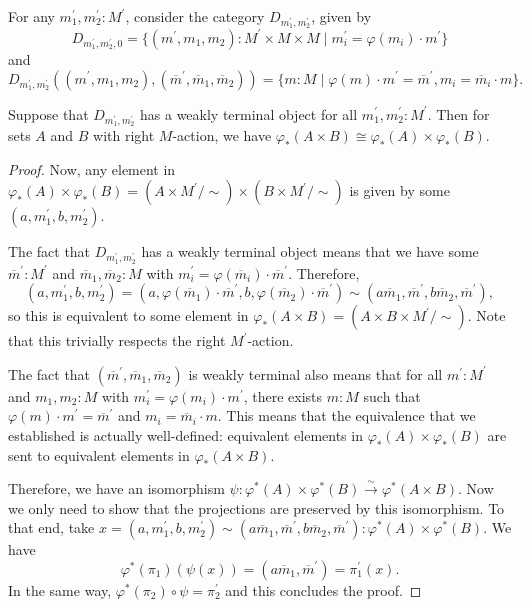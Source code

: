 For any $ m^\prime_1, m^\prime_2: M^\prime $, consider the category $ D_{m^\prime_1, m^\prime_2} $, given by
\[ D_{m^\prime_1, m^\prime_2, 0} = \{ (m^\prime, m_1, m_2): M^\prime \times M \times M \mid m_i^\prime = \varphi(m_i) \cdot m^\prime \} \]
and
\[ D_{m^\prime_1, m^\prime_2}((m^\prime, m_1, m_2), (\overline m^\prime, \overline m_1, \overline m_2)) = \{ m: M \mid \varphi(m) \cdot m^\prime = \overline m^\prime, m_i = \overline m_i \cdot m \}. \]

\begin{lemma}\label{lem:scalar-extension-product}
  Suppose that $ D_{m^\prime_1, m^\prime_2} $ has a weakly terminal object for all $ m^\prime_1, m^\prime_2: M^\prime $. Then for sets $ A $ and $ B $ with right $ M $-action, we have $ \varphi_*(A \times B) \cong \varphi_*(A) \times \varphi_*(B) $.
\end{lemma}
\begin{proof}
  Now, any element in $ \varphi_*(A) \times \varphi_*(B) = (A \times M^\prime / \sim) \times (B \times M^\prime / \sim) $ is given by some $ (a, m^\prime_1, b, m^\prime_2) $.

  The fact that $ D_{m^\prime_1, m^\prime_2} $ has a weakly terminal object means that we have some $ \overline m^\prime: M^\prime $ and $ \overline m_1, \overline m_2: M $ with $ m_i^\prime = \varphi(\overline m_i) \cdot \overline m^\prime $. Therefore,
  \[ (a, m^\prime_1, b, m^\prime_2) = (a, \varphi(\overline m_1) \cdot \overline m^\prime, b, \varphi(\overline m_2) \cdot \overline m^\prime) \sim (a \overline m_1, \overline m^\prime, b \overline m_2, \overline m^\prime), \]
  so this is equivalent to some element in $ \varphi_*(A \times B) = (A \times B \times M^\prime / \sim) $. Note that this trivially respects the right $ M^\prime $-action.

  The fact that $ (\overline m^\prime, \overline m_1, \overline m_2) $ is weakly terminal also means that for all $ m^\prime: M^\prime $ and $ m_1, m_2: M $ with $ m_i^\prime = \varphi(m_i) \cdot m^\prime $, there exists $ m: M $ such that $ \varphi(m) \cdot m^\prime = \overline m^\prime $ and $ m_i = \overline m_i \cdot m $. This means that the equivalence that we established is actually well-defined: equivalent elements in $ \varphi_*(A) \times \varphi_*(B) $ are sent to equivalent elements in $ \varphi_*(A \times B) $.

  Therefore, we have an isomorphism $ \psi: \varphi^*(A) \times \varphi^*(B) \xrightarrow{\sim} \varphi^*(A \times B) $. Now we only need to show that the projections are preserved by this isomorphism. To that end, take $ x = (a, m^\prime_1, b, m^\prime_2) \sim (a \overline m_1, \overline m^\prime, b \overline m_2, \overline m^\prime) : \varphi^*(A) \times \varphi^*(B) $. We have
  \[ \varphi^*(\pi_1)(\psi(x)) = (a \overline m_1, \overline m^\prime) = \pi^\prime_1(x). \]
  In the same way, $ \varphi^*(\pi_2) \circ \psi = \pi^\prime_2 $ and this concludes the proof.
\end{proof}



